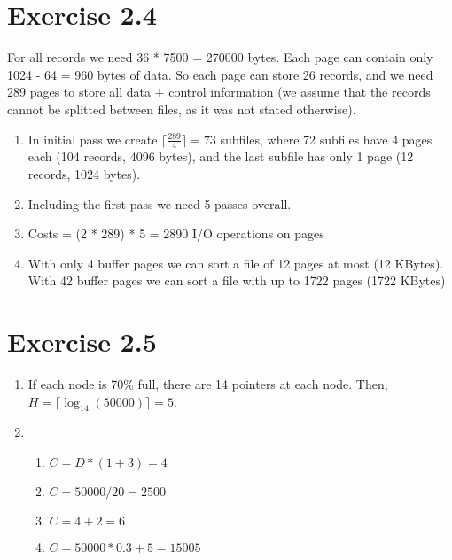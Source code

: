\documentclass[10pt]{article}
\begin{document}
  \section*{Exercise 2.4}
  For all records we need 36 * 7500 = 270000 bytes. Each page can contain only 1024 - 64 = 960 bytes of data. So each page can store 26 records, and we need 289 pages to store all data + control information (we assume that the records cannot be splitted between files, as it was not stated otherwise).
   \begin{enumerate}[label=\arabic*.]
      \item
      	In initial pass we create $\lceil \frac{289}{4} \rceil = 73$ subfiles, where 72 subfiles have 4 pages each (104 records, 4096 bytes), and the last subfile has only 1 page (12 records, 1024 bytes).
      \item
      	Including the first pass we need 5 passes overall.
      \item
      	Costs = (2 * 289) * 5 = 2890 I/O operations on pages
      \item
      	With only 4 buffer pages we can sort a file of 12 pages at most (12 KBytes).\\
      	With 42 buffer pages we can sort a file with up to 1722 pages (1722 KBytes) 

  \end{enumerate}


  \section*{Exercise 2.5}
   \begin{enumerate}[label=\arabic*.]
      \item
      	If each node is 70\% full, there are 14 pointers at each node. Then, $H = \lceil \log_{14}(50000) \rceil = 5$.
      \item
      	\begin{enumerate}[label=\alph*.]
          \item $C = D*(1+3) = 4$
          \item $C = 50000 / 20 = 2500$
          \item $C = 4 + 2 = 6$
          \item $C = 50000 * 0.3 + 5 = 15005$
        \end{enumerate}

  \end{enumerate}
\end{document}
